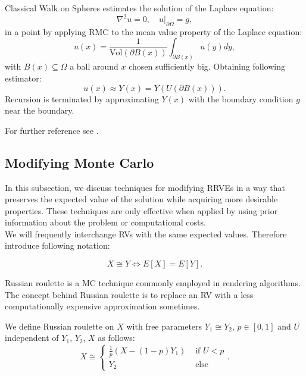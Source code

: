 \documentclass[a4paper,12pt]{article}
\begin{document}
\begin{example} \label{ex: walk on spheres}
  Classical Walk on Spheres estimates the solution of the Laplace equation:
  \begin{equation} \label{eq:laplace}
    \nabla^2 u = 0, \quad u|_{\partial \Omega} = g,
  \end{equation}
  in a point by applying RMC to the mean value property of the Laplace equation:
  \begin{equation}\label{eq:mean value}
    u(x) = \frac{1}{\text{Vol}(\partial B(x))} \int_{\partial B(x)} u(y) dy,
  \end{equation}
  with $B(x) \subseteq \Omega$ a ball around $x$ chosen sufficiently big.
  Obtaining following estimator:
  \begin{equation}
    u(x) \approx Y(x) = Y(U(\partial B(x)))
    .
  \end{equation}
  Recursion is terminated by approximating $Y(x)$ with the boundary condition $g$
  near the boundary.
\end{example}

\begin{related}
  For further reference see \cite{sawhney_monte_nodate}.
\end{related}


\subsection{Modifying Monte Carlo}

In this subsection, we discuss techniques for modifying RRVEs
in a way that preserves the expected value of the solution while
acquiring more desirable properties. These techniques are only
effective when applied by using prior information
about the problem or computational costs. \\

We will frequently interchange RVs with the same expected values.
Therefore introduce following notation:
\begin{notation}[$\cong$]
  \[
    X \cong Y \iff E[X]=E[Y]
    .\]
\end{notation}

Russian roulette is a MC technique commonly employed in rendering algorithms.
The concept behind Russian roulette is to replace an RV with a
less computationally expensive approximation sometimes.

\begin{definition} \label{Russian roulette}
  We define Russian roulette on $X$ with free parameters
  $Y_{1} \cong Y_{2}$, $p \in [0,1]$
  and $U$ independent of $Y_{1}$, $Y_{2}$, $X$
  as follows:
  \begin{equation}
    X \cong
    \begin{cases}
      \frac{1}{p}(X - (1-p)Y_{1}) & \text{ if } U < p \\
      Y_{2}                       & \text{ else }
    \end{cases}.
  \end{equation}
\end{definition}
\end{document}
